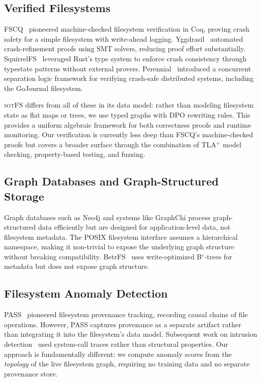 \documentclass[11pt,a4paper]{article}
\theoremstyle{definition}
\theoremstyle{remark}
\newcommand{\sotfs}{\textsc{sotFS}}
\begin{document}
\subsection{Verified Filesystems}

FSCQ~\cite{chen2015} pioneered machine-checked filesystem
verification in Coq, proving crash safety for a simple filesystem
with write-ahead logging. Yggdrasil~\cite{sigurbjarnarson2016}
automated crash-refinement proofs using SMT solvers, reducing
proof effort substantially. SquirrelFS~\cite{kadekodi2024} leveraged
Rust's type system to enforce crash consistency through typestate
patterns without external provers. Perennial~\cite{chajed2019}
introduced a concurrent separation logic framework for verifying
crash-safe distributed systems, including the GoJournal filesystem.

\sotfs{} differs from all of these in its data model: rather than
modeling filesystem state as flat maps or trees, we use typed graphs
with DPO rewriting rules. This provides a uniform algebraic framework
for both correctness proofs and runtime monitoring. Our verification
is currently less deep than FSCQ's machine-checked proofs but covers
a broader surface through the combination of TLA$^+$ model checking,
property-based testing, and fuzzing.

\subsection{Graph Databases and Graph-Structured Storage}

Graph databases such as Neo4j and systems like GraphChi process
graph-structured data efficiently but are designed for application-level
data, not filesystem metadata. The POSIX filesystem interface assumes
a hierarchical namespace, making it non-trivial to expose the
underlying graph structure without breaking compatibility.
BetrFS~\cite{jannen2015} uses write-optimized B$^\varepsilon$-trees
for metadata but does not expose graph structure.

\subsection{Filesystem Anomaly Detection}

PASS~\cite{muniswamy2006} pioneered filesystem provenance tracking,
recording causal chains of file operations. However, PASS captures
provenance as a separate artifact rather than integrating it into the
filesystem's data model. Subsequent work on intrusion
detection~\cite{king2003,goel2005} used system-call traces rather
than structural properties. Our approach is fundamentally different:
we compute anomaly scores from the \emph{topology} of the live
filesystem graph, requiring no training data and no separate
provenance store.
\end{document}
